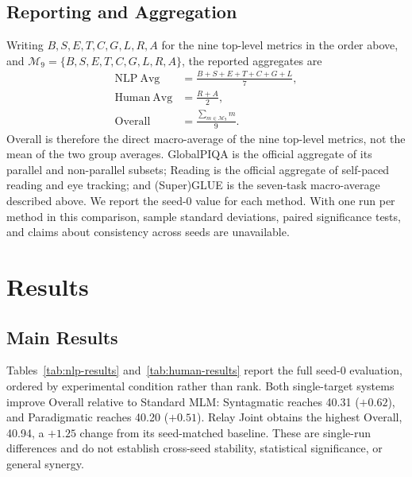 \documentclass[11pt,a4paper]{article}
\begin{document}
\subsection{Reporting and Aggregation}
\label{sec:reporting}

Writing $B,S,E,T,C,G,L,R,A$ for the nine top-level metrics in the
order above, and $\mathcal{M}_9=\{B,S,E,T,C,G,L,R,A\}$, the
reported aggregates are
\begin{align}
\mathrm{NLP\ Avg} &= \frac{B+S+E+T+C+G+L}{7},\\
\mathrm{Human\ Avg} &= \frac{R+A}{2},\\
\mathrm{Overall} &= \frac{\sum_{m\in\mathcal{M}_9}m}{9}.
\label{eq:evaluation-aggregates}
\end{align}
Overall is therefore the direct macro-average of the nine top-level
metrics, not the mean of the two group averages. GlobalPIQA is the
official aggregate of its parallel and non-parallel subsets; Reading is
the official aggregate of self-paced reading and eye tracking; and
(Super)GLUE is the seven-task macro-average described above. We report
the seed-0 value for each method. With one run per method in this
comparison, sample standard deviations, paired significance tests, and
claims about consistency across seeds are unavailable.

\section{Results}

\subsection{Main Results}
\label{sec:main-results}

Tables~\ref{tab:nlp-results} and~\ref{tab:human-results} report the
full seed-0 evaluation, ordered by experimental condition rather than
rank. Both single-target systems improve Overall relative to Standard
MLM: Syntagmatic reaches 40.31 ($+0.62$), and Paradigmatic reaches
40.20 ($+0.51$). Relay Joint obtains the highest Overall, 40.94, a
$+1.25$ change from its seed-matched baseline. These are single-run
differences and do not establish cross-seed stability, statistical
significance, or general synergy.
\end{document}
